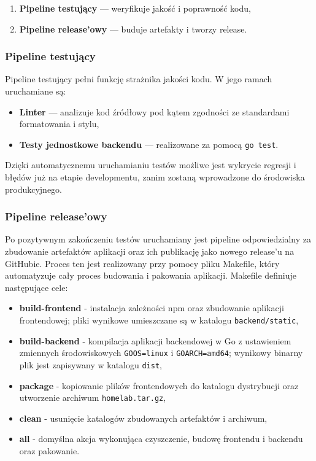 \begin{enumerate}
    \item \textbf{Pipeline testujący} — weryfikuje jakość i poprawność kodu,
    \item \textbf{Pipeline release'owy} — buduje artefakty i tworzy release.
\end{enumerate}

\subsubsection{Pipeline testujący}

Pipeline testujący pełni funkcję strażnika jakości kodu. W jego ramach uruchamiane są:

\begin{itemize}
    \item \textbf{Linter} — analizuje kod źródłowy pod kątem zgodności ze standardami formatowania i stylu,
    \item \textbf{Testy jednostkowe backendu} — realizowane za pomocą \texttt{go test}.
\end{itemize}

Dzięki automatycznemu uruchamianiu testów możliwe jest wykrycie regresji i błędów już na etapie developmentu, zanim zostaną wprowadzone do środowiska produkcyjnego.

\subsubsection{Pipeline release'owy}

Po pozytywnym zakończeniu testów uruchamiany jest pipeline odpowiedzialny za zbudowanie artefaktów aplikacji oraz ich publikację jako nowego release'u na GitHubie. Proces ten jest realizowany przy pomocy pliku Makefile, który automatyzuje cały proces budowania i pakowania aplikacji. Makefile definiuje następujące cele:

\begin{itemize}
    \item \textbf{build-frontend} - instalacja zależności npm oraz zbudowanie aplikacji frontendowej; pliki wynikowe umieszczane są w katalogu \texttt{backend/static},
    \item \textbf{build-backend} - kompilacja aplikacji backendowej w Go z ustawieniem zmiennych środowiskowych \texttt{GOOS=linux} i \texttt{GOARCH=amd64}; wynikowy binarny plik jest zapisywany w katalogu \texttt{dist},
    \item \textbf{package} - kopiowanie plików frontendowych do katalogu dystrybucji oraz utworzenie archiwum \texttt{homelab.tar.gz},
    \item \textbf{clean} - usunięcie katalogów zbudowanych artefaktów i archiwum,
    \item \textbf{all} - domyślna akcja wykonująca czyszczenie, budowę frontendu i backendu oraz pakowanie.
\end{itemize}

